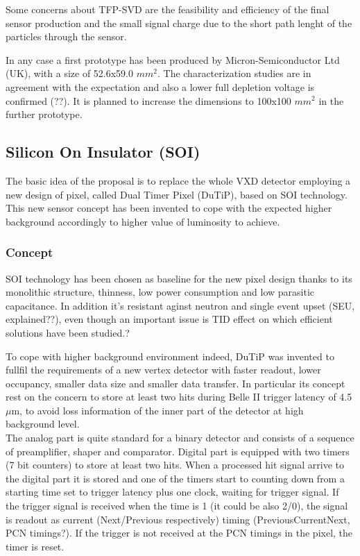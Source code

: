 Some concerns about TFP-SVD are the feasibility and efficiency of the final sensor production and the small signal charge due to the short path lenght of the particles through the sensor.

In any case a first prototype has been produced by Micron-Semiconductor Ltd (UK), with a size of 52.6x59.0 $mm^{2}$. The characterization studies are in agreement with the expectation and also a lower full depletion voltage is confirmed (??). It is planned to increase the dimensions to 100x100 $mm^{2}$ in the further prototype.


\subsection{Silicon On Insulator (SOI)}

The basic idea of the proposal is to replace the whole VXD detector employing a new design of pixel, called Dual Timer Pixel (DuTiP), based on SOI technology. This new sensor concept has been invented to cope with the expected higher background accordingly to higher value of luminosity to achieve.

\subsubsection{Concept}

SOI technology has been chosen as baseline for the new pixel design thanks to its monolithic structure, thinness, low power consumption and low parasitic capacitance. In addition it's resistant aginst neutron and single event upset (SEU, explained??), even though an important issue is TID effect on which efficient solutions have been studied.?

To cope with higher background environment indeed, DuTiP was invented to fullfil the requirements of a new vertex detector with faster readout, lower occupancy, smaller data size and smaller data transfer. In particular its concept rest on the concern to store at least two hits during Belle II trigger latency of 4.5 $\mu$m, to avoid loss information of the inner part of the detector at high background level. \\
The analog part is quite standard for a binary detector and consists of a sequence of preamplifier, shaper and comparator. Digital part is equipped with two timers (7 bit counters) to store at least two hits. When a processed hit signal arrive to the digital part it is stored and one of the timers start to counting down from a starting time set to trigger latency plus one clock, waiting for trigger signal. If the trigger signal is received when the time is 1 (it could be also 2/0), the signal is readout as current (Next/Previous respectively) timing (PreviousCurrentNext, PCN timings?). If the trigger is not received at the PCN timings in the pixel, the timer is reset. 

